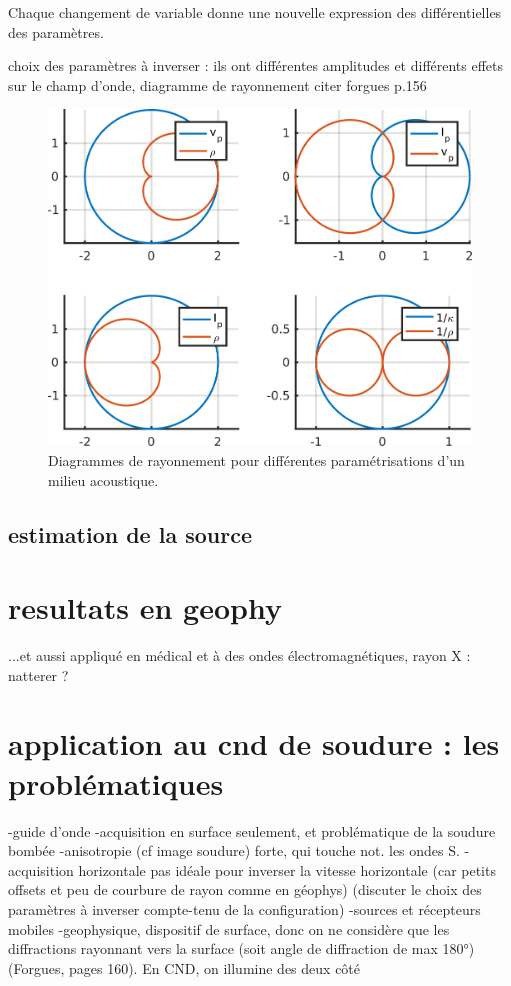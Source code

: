 Chaque changement de variable donne une nouvelle expression des différentielles des paramètres. 

choix des paramètres à inverser : ils ont différentes amplitudes et différents effets sur le champ d'onde, 
diagramme de rayonnement
citer forgues p.156 \citep{forgues}

\begin{figure}[!h]
	\includegraphics[scale=0.5]{img/rayonnement.png}
	\caption{Diagrammes de rayonnement pour différentes paramétrisations d'un milieu acoustique.\label{rayonnement}}
\end{figure}


\subsection{estimation de la source}






\section{resultats en geophy}

...et aussi appliqué en médical et à des ondes électromagnétiques, rayon X : natterer ?

\section{application au cnd de soudure : les problématiques}

-guide d'onde
-acquisition en surface seulement, et problématique de la soudure bombée
-anisotropie (cf image soudure) forte, qui touche not. les ondes S.
-acquisition horizontale pas idéale pour inverser la vitesse horizontale (car petits offsets et peu de courbure de rayon comme en géophys) (discuter le choix des paramètres à inverser compte-tenu de la configuration)
-sources et récepteurs mobiles 
-geophysique, dispositif de surface, donc on ne considère que les diffractions rayonnant vers la surface (soit angle de diffraction de max 180°)(Forgues, pages 160). En CND, on illumine des deux côté



